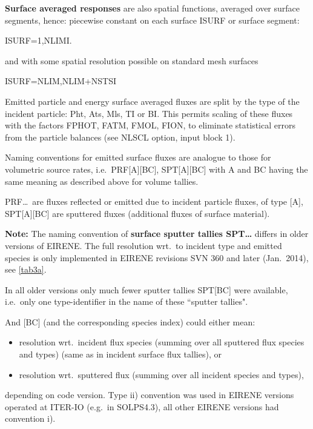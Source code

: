 \textbf{Surface averaged responses} are also spatial functions, averaged over
surface segments, hence:
piecewise constant on each surface ISURF or surface segment:

ISURF=1,NLIMI.

and with some spatial resolution possible on standard mesh surfaces

ISURF=NLIM,NLIM+NSTSI 

Emitted particle and energy surface averaged fluxes are split by the type of
the incident particle: \acf{Pht}, \acf{Ats}, \acf{Mls}, \acf{TI} or \ac{BI}.
This permits scaling of these fluxes with the factors FPHOT, FATM, FMOL, FION,
to eliminate statistical errors from the particle balances (see NLSCL option,
input block 1).

\medskip

Naming conventions for emitted surface fluxes are analogue to those for
volumetric source rates, i.e.\ PRF[A][BC],  SPT[A][BC] with A and BC having the
same meaning as described above for volume tallies.

PRF\dots\ are fluxes reflected or emitted due to incident particle fluxes, of
type [A], SPT[A][BC] are sputtered fluxes (additional fluxes of surface
material).

\textbf{Note:} The naming convention of 
\textbf{surface sputter tallies SPT\dots} differs in older versions of EIRENE.
The full resolution wrt.\ to incident type and emitted species is only
implemented in EIRENE revisions SVN 360 and later (Jan.\ 2014), see
\cref{tab3a}.

In all older versions only much fewer sputter tallies SPT[BC] were available,
i.e.\ only one type-identifier in the name of these ``sputter tallies".

And [BC] (and the corresponding species index) could either mean:

\begin{itemize}
  \item[i)]  resolution wrt.\ incident flux species (summing over all sputtered
        flux species and types) (same as in incident surface flux tallies), or
  \item[ii)] resolution wrt.\ sputtered flux (summing over all incident species
        and types),
\end{itemize}

depending on code version.
Type ii) convention was used in EIRENE versions operated at ITER-IO (e.g.\ in
SOLPS4.3), all other EIRENE versions had convention i).

